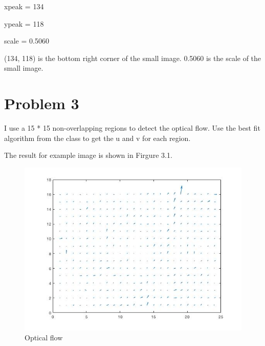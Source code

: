 \documentclass[paper=a4, fontsize=11pt]{scrartcl} %
\numberwithin{equation}{section} %
\numberwithin{figure}{section} %
\numberwithin{table}{subsection} %
\begin{document}
	xpeak = 134
	
	ypeak = 118
	
	scale = 0.5060
	
	(134, 118) is the bottom right corner of the small image.
	0.5060 is the scale of the small image.
	
	
	\section{Problem 3}
	
	I use a 15 * 15 non-overlapping regions to detect the optical flow.
	Use the best fit algorithm from the class to get the u and v for each region.
	
	The result for example image is shown in Firgure 3.1.
	
	\begin{figure}[!htbp]
		\centering
		\includegraphics[width = 16cm]{p4.jpg}
		\caption{Optical flow}
	\end{figure}
	
	
	
\end{document}
